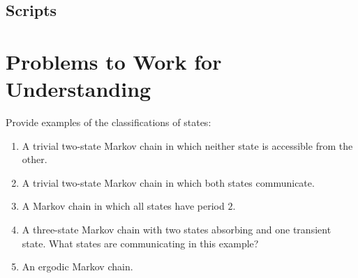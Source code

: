 \documentclass[12pt]{article}
\begin{document}
\subsection*{Scripts}



\hr

\section*{Problems to Work for Understanding}

\renewcommand{\theexerciseseries}{}
\renewcommand{\theexercise}{\arabic{exercise}}

\begin{exercise}
    Provide examples of the classifications of states:
    \begin{enumerate}[label=(\alph*)]
    \item
        A trivial two-state Markov chain in which neither state is
        accessible from the other.
    \item
        A trivial two-state Markov chain in which both states
        communicate.
    \item
        A Markov chain in which all states have period \( 2 \).
    \item
        A three-state Markov chain with two states absorbing and one
        transient state.  What states are communicating in this example?
    \item
        An ergodic Markov chain.
\end{enumerate}
\end{exercise}
\end{document}
